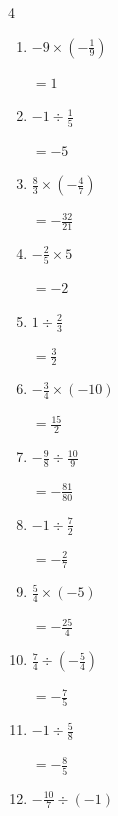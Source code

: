 \begin{multicols}{4}
\begin{enumerate}
        $\displaystyle =\frac{7}{5}$

  \item $\displaystyle -9\times{}\left(-\frac{1}{9}\right)$

        $\displaystyle =1$

  \item $\displaystyle -1\div{}\frac{1}{5}$

        $\displaystyle =-5$

  \item $\displaystyle \frac{8}{3}\times{}\left(-\frac{4}{7}\right)$

        $\displaystyle =-\frac{32}{21}$

  \item $\displaystyle -\frac{2}{5}\times{}5$

        $\displaystyle =-2$

  \item $\displaystyle 1\div{}\frac{2}{3}$

        $\displaystyle =\frac{3}{2}$

\columnbreak %

\resetques

  \item $\displaystyle -\frac{3}{4}\times{}\left(-10\right)$

        $\displaystyle =\frac{15}{2}$

  \item $\displaystyle -\frac{9}{8}\div{}\frac{10}{9}$

        $\displaystyle =-\frac{81}{80}$

  \item $\displaystyle -1\div{}\frac{7}{2}$

        $\displaystyle =-\frac{2}{7}$

  \item $\displaystyle \frac{5}{4}\times{}\left(-5\right)$

        $\displaystyle =-\frac{25}{4}$

  \item $\displaystyle \frac{7}{4}\div{}\left(-\frac{5}{4}\right)$

        $\displaystyle =-\frac{7}{5}$

  \item $\displaystyle -1\div{}\frac{5}{8}$

        $\displaystyle =-\frac{8}{5}$

  \item $\displaystyle -\frac{10}{7}\div{}\left(-1\right)$


\end{enumerate}
\end{multicols}
